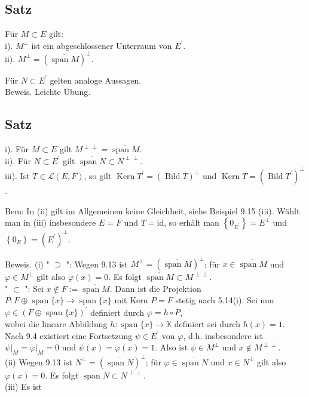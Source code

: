 \documentclass[10pt, letterpaper]{article}
\begin{document}
\subsection*{Satz}
Für $M \subset E$ gilt:\\
i). $M^{\perp}$ ist ein abgeschlossener Unterraum von $E^{\prime}$.\\
ii). $M^{\perp}=(\overline{\operatorname{span} M})^{\perp}$.

Für $N \subset E^{\prime}$ gelten analoge Aussagen.\\
Beweis. Leichte Übung.

\subsection*{Satz}
i). Für $M \subset E$ gilt $M^{\perp \perp}=\overline{\operatorname{span} M}$.\\
ii). Für $N \subset E^{\prime}$ gilt $\overline{\operatorname{span} N} \subset N^{\perp \perp}$.\\
iii). Ist $T \in \mathcal{L}(E, F)$, so gilt $\operatorname{Kern} T^{\prime}=(\operatorname{Bild} T)^{\perp}$ und $\operatorname{Kern} T=\left(\operatorname{Bild} T^{\prime}\right)^{\perp}$.

Bem: In (ii) gilt im Allgemeinen keine Gleichheit, siehe Beispiel 9.15 (iii). Wählt man in (iii) insbesondere $E=F$ und $T=\mathrm{id}$, so erhält man $\left\{0_{E^{\prime}}\right\}=E^{\perp}$ und $\left\{0_{E}\right\}=\left(E^{\prime}\right)^{\perp}$.

Beweis. (i) " $\supset$ ": Wegen 9.13 ist $M^{\perp}=(\overline{\operatorname{span} M})^{\perp}$; für $x \in \overline{\operatorname{span} M}$ und $\varphi \in M^{\perp}$ gilt also $\varphi(x)=0$. Es folgt $\overline{\operatorname{span} M} \subset M^{\perp \perp}$.\\
" $\subset$ ": Sei $x \notin F:=\overline{\operatorname{span} M}$. Dann ist die Projektion $P: F \oplus \operatorname{span}\{x\} \rightarrow \operatorname{span}\{x\}$ mit Kern $P=F$ stetig nach 5.14(i). Sei nun $\varphi \in(F \oplus \operatorname{span}\{x\})^{\prime}$ definiert durch $\varphi=h \circ P$,\\
wobei die lineare Abbildung $h: \operatorname{span}\{x\} \rightarrow \mathbb{K}$ definiert sei durch $h(x)=1$. Nach 9.4 existiert eine Fortsetzung $\psi \in E^{\prime}$ von $\varphi$, d.h. insbesondere ist $\left.\psi\right|_{M}=\left.\varphi\right|_{M}=0$ und $\psi(x)=\varphi(x)=1$. Also ist $\psi \in M^{\perp}$ und $x \notin M^{\perp \perp}$.\\
(ii) Wegen 9.13 ist $N^{\perp}=(\overline{\operatorname{span} N})^{\perp}$; für $\varphi \in \overline{\operatorname{span} N}$ und $x \in N^{\perp}$ gilt also $\varphi(x)=0$. Es folgt $\overline{\operatorname{span} N} \subset N^{\perp \perp}$.\\
(iii) Es ist
\end{document}
